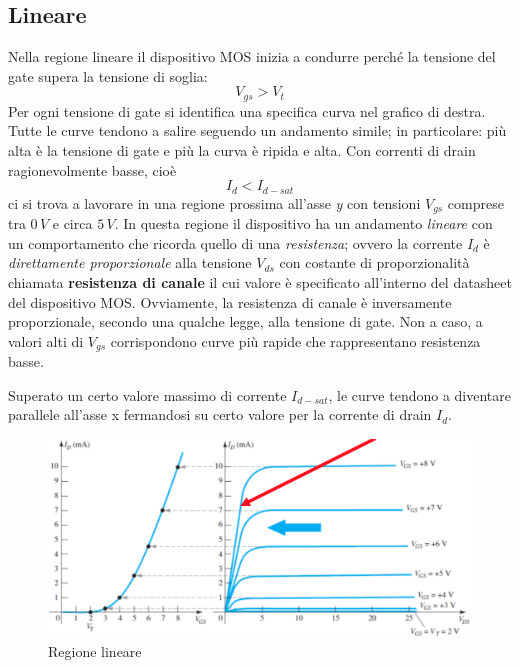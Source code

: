 \documentclass[12pt, a4paper]{report}
\begin{document}
\subsection{Lineare}
Nella regione lineare il dispositivo MOS inizia a condurre perché la tensione del gate supera la tensione di soglia:
\begin{equation}
    V_{gs} > V_{t}
\end{equation}
Per ogni tensione di gate si identifica una specifica curva nel grafico di destra. Tutte le curve tendono a salire seguendo un andamento simile; in particolare: più alta è la tensione di gate e più la curva è ripida e alta. Con correnti di drain ragionevolmente basse, cioè
\begin{equation}
    I_{d} < I_{d-sat}
\end{equation}
ci si trova a lavorare in una regione prossima all'asse \textit{y} con tensioni $V_{gs}$ comprese tra $0\,V$ e circa $5\,V$. In questa regione il dispositivo ha un andamento \textit{lineare} con un comportamento che ricorda quello di una \textit{resistenza}; ovvero la corrente $I_{d}$ è \textit{direttamente proporzionale} alla tensione $V_{ds}$ con costante di proporzionalità chiamata \textbf{resistenza di canale} il cui valore è specificato all'interno del datasheet del dispositivo MOS. Ovviamente, la resistenza di canale è inversamente proporzionale, secondo una qualche legge, alla tensione di gate. Non a caso, a valori alti di $V_{gs}$ corrispondono curve più rapide che rappresentano resistenza basse.

Superato un certo valore massimo di corrente $I_{d-sat}$, le curve tendono a diventare parallele all'asse x fermandosi su certo valore per la corrente di drain $I_{d}$.
\begin{figure}[h]
    \centering
    \includegraphics[scale=0.39,angle=0]{n_mos_lineare.png}
    \caption{Regione lineare}
\end{figure}
\end{document}
